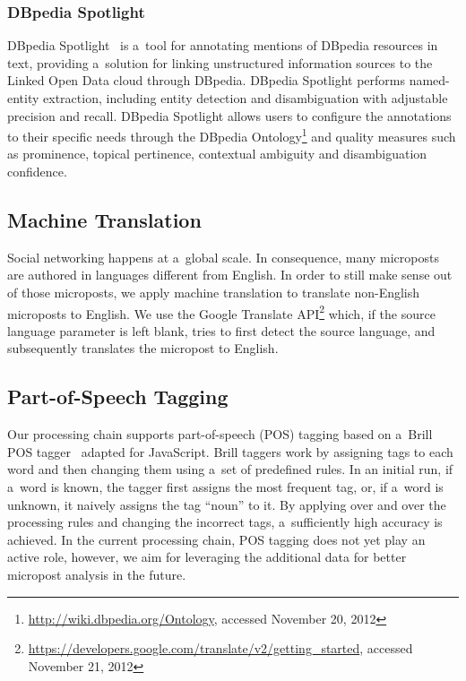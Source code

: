 \subsubsection{DBpedia Spotlight}

DBpedia Spotlight~\cite{mendes2011dbpediaspotlight}
is a~tool for annotating mentions of DBpedia resources in text,
providing a~solution for linking unstructured information sources
to the Linked Open Data cloud through DBpedia.
DBpedia Spotlight performs named-entity extraction,
including entity detection and disambiguation
with adjustable precision and recall.
DBpedia Spotlight allows users to configure the annotations
to their specific needs through the DBpedia
Ontology\footnote{\url{http://wiki.dbpedia.org/Ontology},
accessed November 20, 2012}
and quality measures such as prominence, topical pertinence,
contextual ambiguity and disambiguation confidence.

\subsection{Machine Translation}
\label{sec:machine-translation}

Social networking happens at a~global scale.
In consequence, many microposts are authored
in languages different from English.
In order to still make sense out of those microposts,
we apply machine translation to translate non-English microposts
to English.
We use the Google Translate
API\footnote{\url{https://developers.google.com/translate/v2/getting_started},
accessed November 21, 2012}
which, if the source language parameter is left blank,
tries to first detect the source language,
and subsequently translates the micropost to English.

\subsection{Part-of-Speech Tagging}
Our processing chain supports part-of-speech (POS) tagging
based on a~Brill POS tagger~\cite{brill1992pos} adapted for JavaScript.
Brill taggers work by assigning tags to each word and then changing them
using a~set of predefined rules.
In an initial run, if a~word is known, the tagger
first assigns the most frequent tag,
or, if a~word is unknown, it naively assigns the tag ``noun'' to it.
By applying over and over the processing rules and
changing the incorrect tags, a~sufficiently high accuracy is achieved.
In the current processing chain, POS tagging does not yet
play an active role,
however, we aim for leveraging the additional data
for better micropost analysis in the future.

